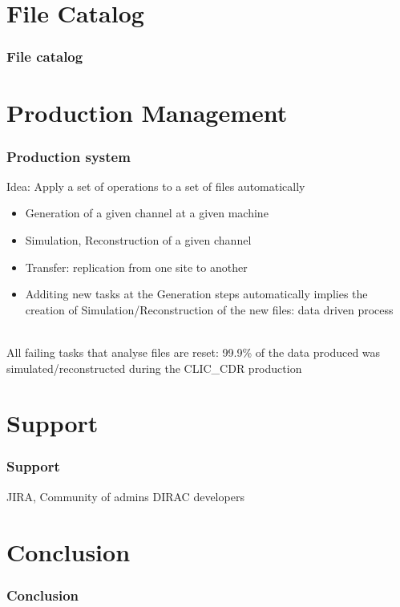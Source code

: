 \documentclass[10pt,table,dvipsnames]{beamer}
\begin{document}
\section{File Catalog}
\label{sec:fc}
\begin{frame}
  \frametitle{File catalog}
\end{frame}

\section{Production Management}
\label{sec:ts}

\begin{frame}
  \frametitle{Production system}
Idea: Apply a set of operations to a set of files automatically
\begin{itemize}
\item Generation of a given channel at a given machine
\item Simulation, Reconstruction of a given channel
\item Transfer: replication from one site to another
\item Additing new tasks at the Generation steps automatically implies
  the creation of Simulation/Reconstruction of the new files: data
  driven process
\end{itemize}
~\\
All failing tasks that analyse files are reset: 99.9\% of the data
produced was simulated/reconstructed during the CLIC\_CDR production
\end{frame}

\section{Support}
\label{sec:support}

\begin{frame}
  \frametitle{Support}
JIRA, 
Community of admins
DIRAC developers
\end{frame}

\section{Conclusion}
\label{sec:conc}
\begin{frame}
  \frametitle{Conclusion}

\end{frame}
\end{document}

